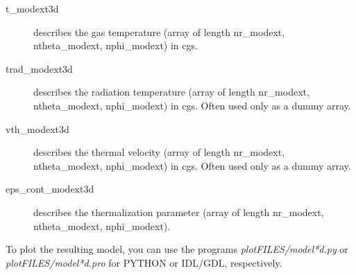 \documentclass[10pt,a4paper]{article}
\begin{document}
\begin{enumerate}
\begin{description}
  \item[t\_modext3d] describes the gas temperature (array of length nr\_modext, ntheta\_modext, nphi\_modext) in cgs.
  \item[trad\_modext3d] describes the radiation temperature (array of length nr\_modext, ntheta\_modext, nphi\_modext) in cgs. Often used only as a dummy array.
  \item[vth\_modext3d] describes the thermal velocity (array of length nr\_modext, ntheta\_modext, nphi\_modext) in cgs. Often used only as a dummy array.
  \item[eps\_cont\_modext3d] describes the thermalization parameter (array of length nr\_modext, ntheta\_modext, nphi\_modext).
    \end{description}
\end{enumerate}
%
To plot the resulting model, you can use the programs
\textit{plotFILES/model*d.py} or \textit{plotFILES/model*d.pro} for
PYTHON or IDL/GDL, respectively.
%
\end{document}
